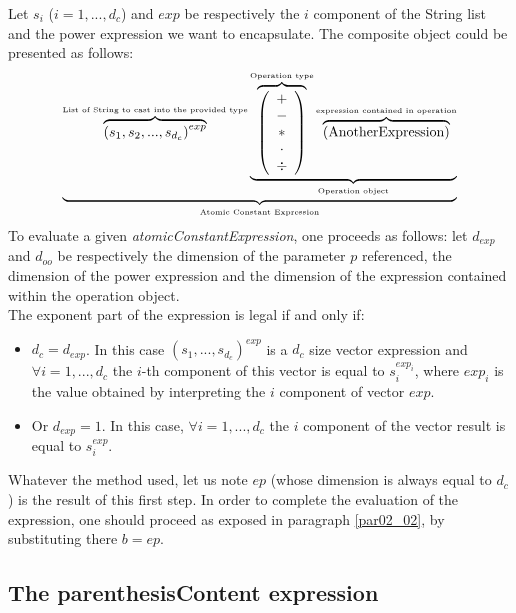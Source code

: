 \documentclass[a4paper,11pt] {ivoa}
\newcommand{\tocheck}[1]{{\color{red} #1}}
\begin{document}
Let $s_i$ ($i=1,...,d_c$) and $exp$ be respectively the $i$ component of the String list and the
power expression we want to encapsulate. The composite object could be presented as follows:
\begin{equation}
 \underbrace{    \overbrace{ \left( s_1  , s_2, ..., s_{d_c}\right)^{exp} }^{\mbox{\tiny List of String  to cast into the provided type}}   \underbrace{  \overbrace{\left( \begin{array}{c} + \\ - \\ \ast  \\ \cdot \\ \div   \end{array} \right) }^{\mbox{\tiny Operation type}}
 \overbrace{    \left( \mbox{AnotherExpression}\right) }^{\mbox{\tiny expression contained in operation}}   }_{\mbox{\tiny Operation object}}}_{\mbox{\tiny Atomic Constant Expression}}
\end{equation}
\tocheck{To evaluate a given {\it atomicConstantExpression}, one proceeds as follows: let $d_{exp}$
and $d_{oo}$ be respectively the dimension of the parameter $p$ referenced, the dimension of the power
expression and the dimension of the expression contained within the operation object.}\\
The exponent part of the expression is legal if and only if:
\begin{itemize}
\item $d_c = d_{exp}$. In this case $(s_1,...,s_{d_c})^{exp}$ is a $d_c$ size vector expression and
$\forall i =1,...,d_c$ the $i$-th component of this vector is equal to $s_i^{exp_i}$, where $exp_i$
is the value obtained by interpreting the $i$ component of vector $exp$.
\item Or $d_{exp}=1$. In this case, $\forall i =1,...,d_c$ the $i$ component of the vector result is
equal to $s_i^{exp}$.\\
\end{itemize}
Whatever the method used, let us note $ep$ (whose dimension is always equal to $d_c$)  is the result
of this first step.  In order to complete the evaluation of the expression, one should proceed as
exposed in paragraph \ref{par02_02}, by substituting there $b=ep$.


\subsection{The parenthesisContent expression}\label{par02_04}
\end{document}
